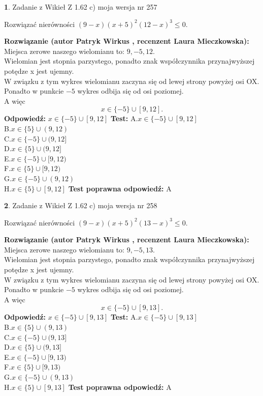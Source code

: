 \documentclass[12pt, a4paper]{article}
\theoremstyle{definition} %
\newtheorem{zad}{}
\newcommand{\zadStart}[1]{\begin{zad}#1\newline}
\newcommand{\zadStop}{\end{zad}}
\newcommand{\rozwStart}[2]{\noindent \textbf{Rozwiązanie (autor #1 , recenzent #2): }\newline}
\newcommand{\rozwStop}{\newline}
\newcommand{\odpStart}{\noindent \textbf{Odpowiedź:}\newline}
\newcommand{\odpStop}{\newline}
\newcommand{\testStart}{\noindent \textbf{Test:}\newline}
\newcommand{\testStop}{\newline}
\newcommand{\kluczStart}{\noindent \textbf{Test poprawna odpowiedź:}\newline}
\newcommand{\kluczStop}{\newline}
\begin{document}
\zadStart{Zadanie z Wikieł Z 1.62 c) moja wersja nr 257}

Rozwiązać nierówności $(9-x)(x+5)^{2}(12-x)^{3}\le0$.
\zadStop
\rozwStart{Patryk Wirkus}{Laura Mieczkowska}
Miejsca zerowe naszego wielomianu to: $9, -5, 12$.\\
Wielomian jest stopnia parzystego, ponadto znak współczynnika przy\linebreak najwyższej potędze x jest ujemny.\\ W związku z tym wykres wielomianu zaczyna się od lewej strony powyżej osi OX.\\
Ponadto w punkcie $-5$ wykres odbija się od osi poziomej.\\
A więc $$x \in \{-5\} \cup [9,12].$$
\rozwStop
\odpStart
$x \in \{-5\} \cup [9,12]$
\odpStop
\testStart
A.$x \in \{-5\} \cup [9,12]$\\
B.$x \in \{5\} \cup (9,12)$\\
C.$x \in \{-5\} \cup (9,12]$\\
D.$x \in \{5\} \cup (9,12]$\\
E.$x \in \{-5\} \cup [9,12)$\\
F.$x \in \{5\} \cup [9,12)$\\
G.$x \in \{-5\} \cup (9,12)$\\
H.$x \in \{5\} \cup [9,12]$
\testStop
\kluczStart
A
\kluczStop



\zadStart{Zadanie z Wikieł Z 1.62 c) moja wersja nr 258}

Rozwiązać nierówności $(9-x)(x+5)^{2}(13-x)^{3}\le0$.
\zadStop
\rozwStart{Patryk Wirkus}{Laura Mieczkowska}
Miejsca zerowe naszego wielomianu to: $9, -5, 13$.\\
Wielomian jest stopnia parzystego, ponadto znak współczynnika przy\linebreak najwyższej potędze x jest ujemny.\\ W związku z tym wykres wielomianu zaczyna się od lewej strony powyżej osi OX.\\
Ponadto w punkcie $-5$ wykres odbija się od osi poziomej.\\
A więc $$x \in \{-5\} \cup [9,13].$$
\rozwStop
\odpStart
$x \in \{-5\} \cup [9,13]$
\odpStop
\testStart
A.$x \in \{-5\} \cup [9,13]$\\
B.$x \in \{5\} \cup (9,13)$\\
C.$x \in \{-5\} \cup (9,13]$\\
D.$x \in \{5\} \cup (9,13]$\\
E.$x \in \{-5\} \cup [9,13)$\\
F.$x \in \{5\} \cup [9,13)$\\
G.$x \in \{-5\} \cup (9,13)$\\
H.$x \in \{5\} \cup [9,13]$
\testStop
\kluczStart
A
\kluczStop
\end{document}
